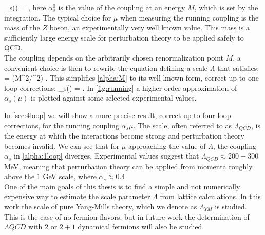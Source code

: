\beq
    \alpha_s(\mu) = ,
    \label{alpha:M}
\eeq  
here $\alpha_s^0$ is the value of the coupling at an energy $M$, which is set by the integration. The typical choice for $\mu$ when measuring the running coupling is the mass of the $Z$ boson, an experimentally very well known value. This mass is a sufficiently large energy scale for perturbation theory to be applied safely to QCD. \\
The coupling depends on the arbitrarily chosen renormalization point $M$, a convenient choice is then to rewrite the equation defining a scale $\Lambda$ that satisfies:
 = \log(M^2/\Lambda^2) .
\eeq  
This simplifies \cref{alpha:M} to its well-known form, correct up to one loop corrections:
\beq
    \alpha_s(\mu) = .
    \label{alpha:1loop} 
\eeq
In \cref{fig:running} a higher order approximation of $\alpha_s(\mu)$ is plotted against some selected experimental values.  

In \cref{sec:4loop} we will show a more precise result, correct up to four-loop corrections, for the running coupling $\alpha_s{\mu}$. The scale, often referred to as $\Lambda_{QCD}$, is the energy at which the interactions become strong and perturbation theory becomes invalid. We can see that for $\mu$ approaching the value of $\Lambda$, the coupling $\alpha_s$ in \cref{alpha:1loop} diverges. Experimental values \cite{dissertori_9._2016} suggest that $\Lambda_{QCD} \approx 200-300$ MeV, meaning that perturbation theory can be applied from momenta roughly above the $1$ GeV scale, where $\alpha_s\approx 0.4$. \\
One of the main goals of this thesis is to find a simple and not numerically expensive way to estimate the scale parameter $\Lambda$ from lattice calculations. In this work the scale of pure Yang-Mills theory, which we denote as $\Lambda_{YM}$ is studied. This is the case of no fermion flavors, but in future work the determination of $\Lambda{QCD}$ with $2$ or $2+1$ dynamical fermions will also be studied. 

